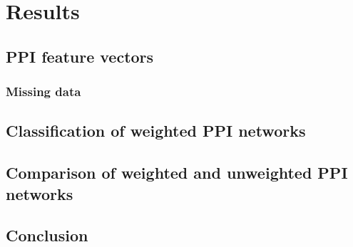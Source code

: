 \chapter{Results}
\label{results}



\section{PPI feature vectors}








\subsection{Missing data}

\section{Classification of weighted PPI networks}




\section{Comparison of weighted and unweighted PPI networks}



\section*{Conclusion}


